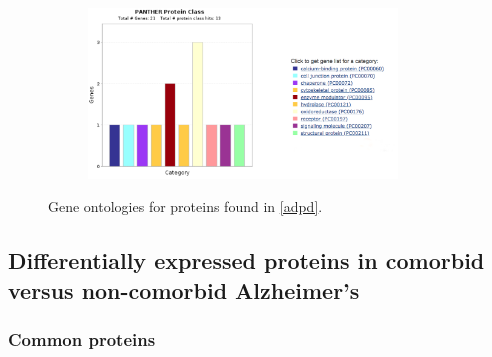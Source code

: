 \begin{figure}[H]
\begin{subfigure}[b]{0.5\linewidth}
\end{subfigure}
\begin{subfigure}[b]{0.5\linewidth}
\centering
\includegraphics[width=0.9\textwidth]{./Figures/GO/adpd/adpd4}\par
\end{subfigure}%
\begin{caption}
  {Gene ontologies for proteins found in \ref{adpd}.}
\end{caption}
\end{figure}

\subsection{Differentially expressed proteins in comorbid versus non-comorbid Alzheimer's}
\label{sec:comp-diff-expr}

\subsubsection{Common proteins}
\label{subsec:adpdANDad}


